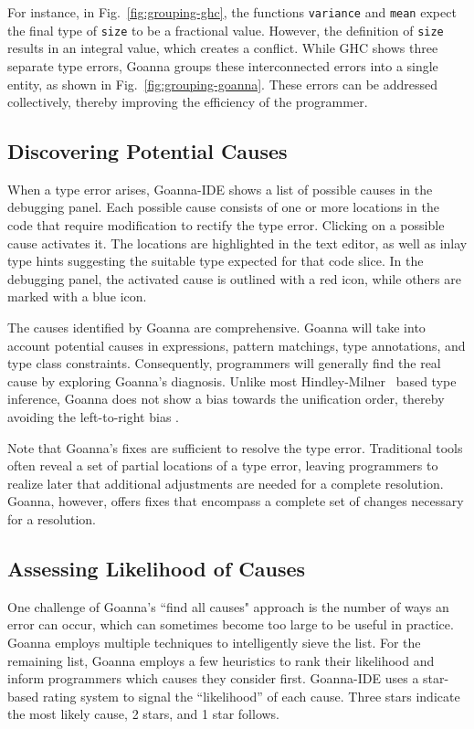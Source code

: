 \documentclass[pdflatex,lineno,sn-nature,Numbered]{sn-jnl}%
\begin{document}
    For instance, in Fig.~\ref{fig:grouping-ghc}, the functions \texttt{variance} and \texttt{mean} expect the final type of \texttt{size} to be a fractional value. However, the definition of \texttt{size} results in an integral value, which creates a conflict. While GHC shows three separate type errors, Goanna groups these interconnected errors into a single entity, as shown in Fig.~\ref{fig:grouping-goanna}. These errors can be addressed collectively, thereby improving the efficiency of the programmer.

    \subsection{Discovering Potential Causes} \label{sub:suggesting}
    When a type error arises, Goanna-IDE shows a list of possible causes in the debugging panel. Each possible cause consists of one or more locations in the code that require modification to rectify the type error. Clicking on a possible cause activates it. The locations are highlighted in the text editor, as well as inlay type hints suggesting the suitable type expected for that code slice. In the debugging panel, the activated cause is outlined with a red icon, while others are marked with a blue icon. 

    The causes identified by Goanna are comprehensive. Goanna will take into account potential causes in expressions, pattern matchings, type annotations, and type class constraints. Consequently, programmers will generally find the real cause by exploring Goanna's diagnosis. Unlike most Hindley-Milner~\cite{Damas1982-zw} based type inference, Goanna does not show a bias towards the unification order, thereby avoiding the left-to-right bias \cite{Chen2014-ev}. 
    
    Note that Goanna's fixes are sufficient to resolve the type error. Traditional tools often reveal a set of partial locations of a type error, leaving programmers to realize later that additional adjustments are needed for a complete resolution. Goanna, however, offers fixes that encompass a complete set of changes necessary for a resolution.


    \subsection{Assessing Likelihood of Causes} \label{sub:conciseness}
    One challenge of Goanna's ``find all causes" approach is the number of ways an error can occur, which can sometimes become too large to be useful in practice. Goanna employs multiple techniques to intelligently sieve the list. For the remaining list, Goanna employs a few heuristics to rank their likelihood and inform programmers which causes they consider first. 
    Goanna-IDE uses a star-based rating system to signal the ``likelihood'' of each cause. Three stars indicate the most likely cause, 2 stars, and 1 star follows. 
\end{document}
